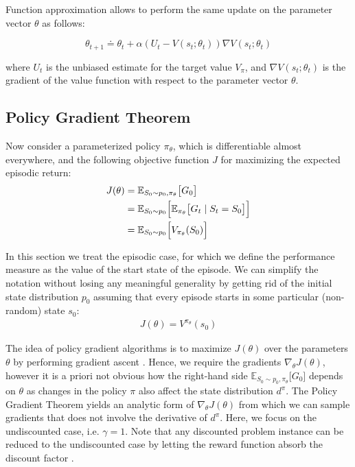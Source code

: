 Function approximation allows to perform the same update on the parameter vector $\theta$ as follows:

$$\theta_{t+1} \doteq \theta_t + \alpha (U_t - V(s_t;\theta_t)) \nabla V(s_t;\theta_t)$$

where $U_t$ is the unbiased estimate for the target value $V_\pi$, and $\nabla V(s_t;\theta_t)$ is the gradient of the value function
with respect to the parameter vector $\theta$.



\subsection{Policy Gradient Theorem}\label{sec:pg_theorem}

Now consider a parameterized policy \(\pi_\theta\), which is differentiable almost everywhere, and the following objective function \(J\) for maximizing the expected episodic return: 
\begin{align*}
	J(\theta) &= \mathbb{E}_{S_0 \sim p_0, \pi_\theta} \bigl[ G_0 \bigr] \\
	&= \mathbb{E}_{S_0 \sim p_0} \Bigl[ \mathbb{E}_{\pi_\theta} \bigl[ G_t \mid S_t = S_0 \bigr] \Bigr] \\
	&= \mathbb{E}_{S_0 \sim p_0} \Bigl[ V_{\pi_\theta}(S_0) \Bigr]
\end{align*}

In this section we treat the episodic case, for which we define the performance measure
as the value of the start state of the episode. We can simplify the notation without
losing any meaningful generality by getting rid of the initial state distribution $p_0$ assuming that every episode starts in some particular
(non-random) state $s_0$:
\begin{align*}
    J(\theta) = V^{\pi_{\theta}}(s_0)
\end{align*}

The idea of policy gradient algorithms is to maximize \(J(\theta)\) over the parameters \(\theta\) by performing gradient ascent \cite{Sutton1998}. 
Hence, we require the gradients \(\nabla_\theta J(\theta)\), however it is a priori not obvious how 
the right-hand side \(\mathbb{E}_{S_0 \sim p_0, \pi_\theta} \bigl[ G_0 \bigr]\) depends on \(\theta\) 
as changes in the policy \(\pi\) also affect the state distribution \(d^\pi\). The Policy Gradient 
Theorem \cite{NIPS1999_464d828b, 905687} yields an analytic form of 
\(\nabla_\theta J(\theta)\) from which we can sample gradients that does not involve the derivative 
of \(d^\pi\). Here, we focus on the undiscounted case, i.e. \(\gamma = 1\). Note that any discounted 
problem instance can be reduced to the undiscounted case by letting the reward function absorb the 
discount factor \cite{schulman2018highdimensionalcontinuouscontrolusing}.


